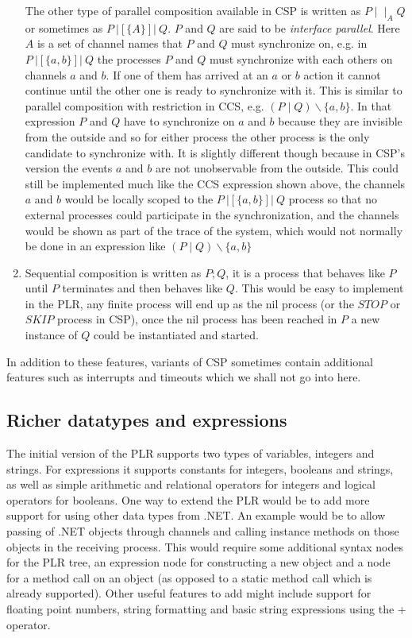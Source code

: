 \begin{enumerate}
		The other type of parallel composition available in CSP is written as $P 
		\mid\mid_A Q$ or sometimes as $P\ |[\{A\}]|\ Q$. $P$ and $Q$ are said 
		to be \textit{interface parallel}. Here $A$ is a set of channel names that 
		$P$ and $Q$ must synchronize on, e.g. in $P\ |[\{a,b\}]|\ Q$ the 
		processes $P$ and $Q$ must synchronize with each others on channels $a$ 
		and $b$. If one of them has arrived at an $a$ or $b$ action it cannot 
		continue until the other one is ready to synchronize with it. This is 
		similar to parallel composition with restriction in CCS, e.g. $(P \mid Q) 
		\backslash\{a,b\}$. In that expression $P$ and $Q$ have to synchronize on 
		$a$ and $b$ because they are invisible from the outside and so for either 
		process the other process is the only candidate to synchronize with. It is 
		slightly different though because in CSP's version the events $a$ and $b$ 
		are not unobservable from the outside. This could still be implemented 
		much like the CCS expression shown above, the channels $a$ and $b$ would 
		be locally scoped to the $P\ |[\{a,b\}]|\ Q$ process so that no 
		external processes could participate in the synchronization, and the 
		channels would be shown as part of the trace of the system, which would 
		not normally be done in an expression like $(P \mid Q) \backslash\{a,b\}$
	
		\item Sequential composition is written as $P;Q$, it is a process that 
		behaves like $P$ until $P$ terminates and then behaves like $Q$.	This 
		would be easy to implement in the PLR, any finite process will end up as 
		the nil process (or the $STOP$ or $SKIP$ process in CSP), once the nil 
		process has been reached in $P$ a new instance of $Q$ could be 
		instantiated and started. 
	
	\end{enumerate}
	
	In addition to these features, variants of CSP sometimes contain additional 
	features such as interrupts and timeouts which we shall not go into here. 
	
	\subsection{Richer datatypes and expressions}
	
	The initial version of the PLR supports two types of variables, integers and 
	strings. For expressions it supports constants for integers, booleans and 
	strings, as well as simple arithmetic and relational operators for integers 
	and logical operators for booleans. One way to extend the PLR would be to 
	add more support for using other data types from .NET. An example would be 
	to allow passing of .NET objects through channels and calling instance 
	methods on those objects in the receiving process. This would require some 
	additional syntax nodes for the PLR tree, an expression node for 
	constructing a new object and a node for a method call on an object (as 
	opposed to a static method call which is already supported). Other useful 
	features to add might include support for floating point numbers, string 
	formatting and basic string expressions using the + operator.
	

